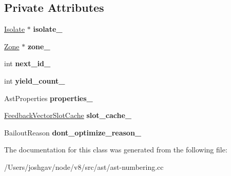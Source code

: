 \subsection*{Private Attributes}
\begin{DoxyCompactItemize}
\item 
\hyperlink{classv8_1_1internal_1_1_isolate}{Isolate} $\ast$ {\bfseries isolate\+\_\+}\hypertarget{classv8_1_1internal_1_1_ast_numbering_visitor_a43f83bc9ed71519475ea54ab26228846}{}\label{classv8_1_1internal_1_1_ast_numbering_visitor_a43f83bc9ed71519475ea54ab26228846}

\item 
\hyperlink{classv8_1_1internal_1_1_zone}{Zone} $\ast$ {\bfseries zone\+\_\+}\hypertarget{classv8_1_1internal_1_1_ast_numbering_visitor_ae72329a2a57767537797f9af44105e19}{}\label{classv8_1_1internal_1_1_ast_numbering_visitor_ae72329a2a57767537797f9af44105e19}

\item 
int {\bfseries next\+\_\+id\+\_\+}\hypertarget{classv8_1_1internal_1_1_ast_numbering_visitor_af905663edd1d3c1cff95400c2049db46}{}\label{classv8_1_1internal_1_1_ast_numbering_visitor_af905663edd1d3c1cff95400c2049db46}

\item 
int {\bfseries yield\+\_\+count\+\_\+}\hypertarget{classv8_1_1internal_1_1_ast_numbering_visitor_ac7dfb476a80affcdbbad0ece223ec42c}{}\label{classv8_1_1internal_1_1_ast_numbering_visitor_ac7dfb476a80affcdbbad0ece223ec42c}

\item 
Ast\+Properties {\bfseries properties\+\_\+}\hypertarget{classv8_1_1internal_1_1_ast_numbering_visitor_adbc7878805b70ff63c56e19e6f0742ba}{}\label{classv8_1_1internal_1_1_ast_numbering_visitor_adbc7878805b70ff63c56e19e6f0742ba}

\item 
\hyperlink{classv8_1_1internal_1_1_feedback_vector_slot_cache}{Feedback\+Vector\+Slot\+Cache} {\bfseries slot\+\_\+cache\+\_\+}\hypertarget{classv8_1_1internal_1_1_ast_numbering_visitor_a34e2431c962ce68bfbb2dbedf1660dae}{}\label{classv8_1_1internal_1_1_ast_numbering_visitor_a34e2431c962ce68bfbb2dbedf1660dae}

\item 
Bailout\+Reason {\bfseries dont\+\_\+optimize\+\_\+reason\+\_\+}\hypertarget{classv8_1_1internal_1_1_ast_numbering_visitor_a53ff3bb0e556d065439f39146bea2d17}{}\label{classv8_1_1internal_1_1_ast_numbering_visitor_a53ff3bb0e556d065439f39146bea2d17}

\end{DoxyCompactItemize}


The documentation for this class was generated from the following file\+:\begin{DoxyCompactItemize}
\item 
/\+Users/joshgav/node/v8/src/ast/ast-\/numbering.\+cc\end{DoxyCompactItemize}
